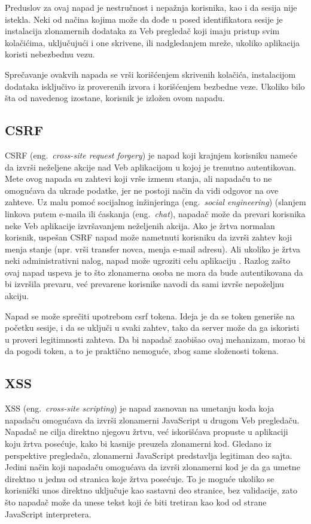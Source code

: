 \documentclass[a4paper]{article}
\begin{document}
Preduslov za ovaj napad je nestručnost i nepažnja korisnika, kao i da sesija nije istekla. Neki od načina kojima može da dođe u posed identifikatora sesije je instalacija zlonamernih dodataka za Veb pregledač koji imaju pristup svim kolačićima, uključujući i one skrivene, ili nadgledanjem mreže, ukoliko aplikacija koristi nebezbednu vezu.

Sprečavanje ovakvih napada se vrši korišćenjem skrivenih kolačića, instalacijom dodataka isključivo iz proverenih izvora i korišćenjem bezbedne veze. Ukoliko bilo šta od navedenog izostane, korisnik je izložen ovom napadu.

\subsection{CSRF}
\label{subsec:csrf}
CSRF (eng.~{\em cross-site request forgery}) je napad koji krajnjem korisniku nameće da izvrši neželjene akcije nad Veb aplikacijom u kojoj je trenutno autentikovan. Mete ovog napada su zahtevi koji vrše izmenu stanja, ali napadaču to ne omogućava da ukrade podatke, jer ne postoji način da vidi odgovor na ove zahteve. Uz malu pomoć socijalnog inžinjeringa (eng.~{\em social engineering}) (slanjem linkova putem e-maila ili ćaskanja (eng.~{\em chat}), napadač može da prevari korisnika neke Veb aplikacije izvršavanjem neželjenih akcija. Ako je žrtva normalan korisnik, uspešan CSRF napad može nametnuti korisniku da izvrši zahtev koji menja stanje (npr. vrši transfer novca, menja e-mail adresu). Ali ukoliko je žrtva neki administrativni nalog, napad može ugroziti celu aplikaciju \cite{csrf1}. Razlog zašto ovaj napad uspeva je to što zlonamerna osoba ne mora da bude autentikovana da bi izvršila prevaru, već prevarene korisnike navodi da sami izvrše nepoželjnu akciju.

Napad se može sprečiti upotrebom csrf tokena. Ideja je da se token generiše na početku sesije, i da se uključi u svaki zahtev, tako da server može da ga iskoristi u proveri legitimnosti zahteva. Da bi napadač zaobišao ovaj mehanizam, morao bi da pogodi token, a to je praktično nemoguće, zbog same složenosti tokena.

\subsection{XSS}
\label{subsec:xss}
XSS (eng.~{\em cross-site scripting}) je napad zasnovan na umetanju koda koja napadaču omogućava da izvrši zlonamerni JavaScript u drugom Veb pregledaču. Napadač ne cilja direktno njegovu žrtvu, već iskorišćava propuste u aplikaciji koju žrtva posećuje, kako bi kasnije preuzela zlonamerni kod. Gledano iz perspektive pregledača, zlonamerni JavaScript predstavlja legitiman deo sajta. Jedini način koji napadaču omogućava da izvrši zlonamerni kod je da ga umetne direktno u jednu od stranica koje žrtva posećuje. To je moguće ukoliko se korisnički unos direktno uključuje kao sastavni deo stranice, bez validacije, zato što napadač može da unese tekst koji će biti tretiran kao kod od strane JavaScript interpretera.
\end{document}
